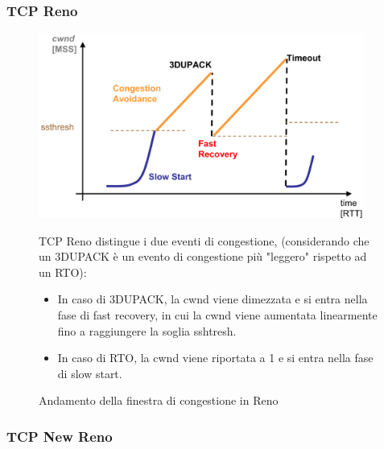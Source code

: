 \subsubsection{TCP Reno}

\begin{figure}[h!]
    \begin{minipage}{0.6\textwidth}
        \centering
        \includegraphics[width=0.95\textwidth]{images/reno.png}
        \caption{Andamento della finestra di congestione in Reno}
        \label{fig:tcpreno}
    \end{minipage}
    \hfill
    \begin{minipage}{0.48\textwidth}
        TCP Reno distingue i due eventi di congestione, (considerando che un 3DUPACK è un evento di congestione più "leggero" rispetto ad un RTO):
            \begin{itemize}
                \item In caso di 3DUPACK, la cwnd viene dimezzata e si entra nella fase di fast recovery, in cui la cwnd viene aumentata linearmente fino a raggiungere la soglia sshtresh.
                \item In caso di RTO, la cwnd viene riportata a 1 e si entra nella fase di slow start.
            \end{itemize}   
    \end{minipage}
\end{figure}

\subsubsection{TCP New Reno}

